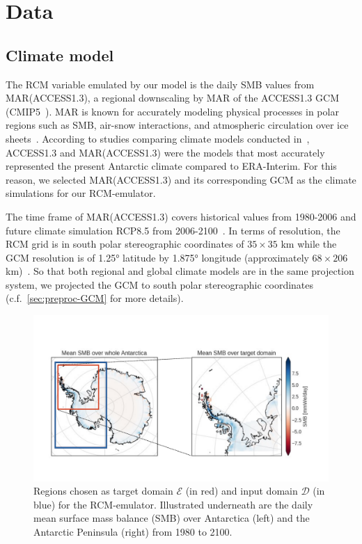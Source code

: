 \documentclass[a4paper,11pt,oneside]{report}
\begin{document}
\section{Data}\label{sec:data}
\subsection{Climate model}
The RCM variable emulated by our model is the daily SMB values from MAR(ACCESS1.3), a regional downscaling by MAR of the ACCESS1.3 GCM (CMIP5~\cite{ACCESS13, CMIP5}). MAR is known for accurately modeling physical processes in polar regions such as SMB, air-snow interactions, and atmospheric circulation over ice sheets~\cite{MAR}. According to studies comparing climate models conducted in~\cite{Kittel, Agosta2015}, ACCESS1.3 and MAR(ACCESS1.3) were the models that most accurately represented the present Antarctic climate compared to ERA-Interim. For this reason, we selected MAR(ACCESS1.3) and its corresponding GCM as the climate simulations for our RCM-emulator. 

The time frame of MAR(ACCESS1.3) covers historical values from 1980-2006 and future climate simulation RCP8.5 from 2006-2100~\cite{Moss2010}. In terms of resolution, the RCM grid is in south polar stereographic coordinates of $35 \times 35$ \si{km} while the GCM resolution is of 1.25° latitude by 1.875° longitude (approximately $68 \times 206$ \si{km})~\cite{ACCESS13, ACCESS13_2}. So that both regional and global climate models are in the same projection system, we projected the GCM to south polar stereographic coordinates (c.f.~\autoref{sec:preproc-GCM} for more details). 

\begin{figure}[!t]
  \centering
  \includegraphics[width=\columnwidth]{images/domains.pdf}
  \caption []{\small Regions chosen as target domain $\mathcal{E}$ (in red) and input domain $\mathcal{D}$ (in blue) for the RCM-emulator. Illustrated underneath are the daily mean surface mass balance (SMB) over Antarctica (left) and the Antarctic Peninsula (right) from 1980 to 2100.}
  \vspace{-3mm}
    \label{fig:region-of-choice}
\end{figure}
\end{document}

